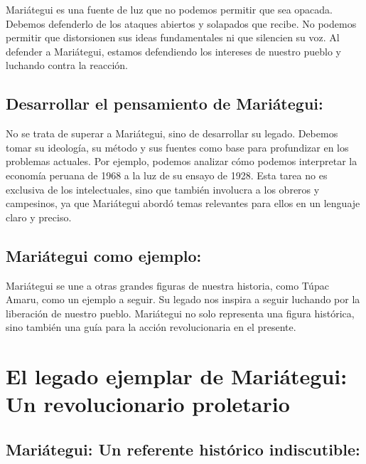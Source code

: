 \documentclass[
  letterpaper,
  DIV=11,
  numbers=noendperiod]{scrartcl}
\begin{document}
Mariátegui es una fuente de luz que no podemos permitir que sea opacada.
Debemos defenderlo de los ataques abiertos y solapados que recibe. No
podemos permitir que distorsionen sus ideas fundamentales ni que
silencien su voz. Al defender a Mariátegui, estamos defendiendo los
intereses de nuestro pueblo y luchando contra la reacción.

\hypertarget{desarrollar-el-pensamiento-de-mariuxe1tegui}{%
\subsection{Desarrollar el pensamiento de
Mariátegui:}\label{desarrollar-el-pensamiento-de-mariuxe1tegui}}

No se trata de superar a Mariátegui, sino de desarrollar su legado.
Debemos tomar su ideología, su método y sus fuentes como base para
profundizar en los problemas actuales. Por ejemplo, podemos analizar
cómo podemos interpretar la economía peruana de 1968 a la luz de su
ensayo de 1928. Esta tarea no es exclusiva de los intelectuales, sino
que también involucra a los obreros y campesinos, ya que Mariátegui
abordó temas relevantes para ellos en un lenguaje claro y preciso.

\hypertarget{mariuxe1tegui-como-ejemplo}{%
\subsection{Mariátegui como ejemplo:}\label{mariuxe1tegui-como-ejemplo}}

Mariátegui se une a otras grandes figuras de nuestra historia, como
Túpac Amaru, como un ejemplo a seguir. Su legado nos inspira a seguir
luchando por la liberación de nuestro pueblo. Mariátegui no solo
representa una figura histórica, sino también una guía para la acción
revolucionaria en el presente.

\hypertarget{el-legado-ejemplar-de-mariuxe1tegui-un-revolucionario-proletario}{%
\section{El legado ejemplar de Mariátegui: Un revolucionario
proletario}\label{el-legado-ejemplar-de-mariuxe1tegui-un-revolucionario-proletario}}

\hypertarget{mariuxe1tegui-un-referente-histuxf3rico-indiscutible}{%
\subsection{Mariátegui: Un referente histórico
indiscutible:}\label{mariuxe1tegui-un-referente-histuxf3rico-indiscutible}}
\end{document}
